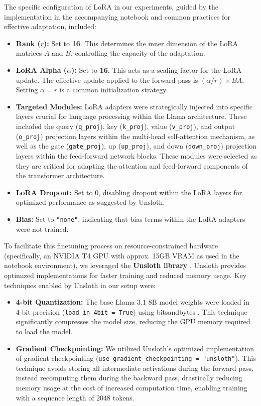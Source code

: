 \documentclass[twocolumn,11pt,letterpaper]{article}
\begin{document}
The specific configuration of LoRA in our experiments, guided by the implementation in the accompanying notebook and common practices for effective adaptation, included:
\begin{itemize}
    \item \textbf{Rank ($r$):} Set to \textbf{16}. This determines the inner dimension of the LoRA matrices $A$ and $B$, controlling the capacity of the adaptation.
    \item \textbf{LoRA Alpha ($\alpha$):} Set to \textbf{16}. This acts as a scaling factor for the LoRA update. The effective update applied to the forward pass is $(\alpha / r) \times BA$. Setting $\alpha = r$ is a common initialization strategy.
    \item \textbf{Targeted Modules:} LoRA adapters were strategically injected into specific layers crucial for language processing within the Llama architecture. These included the query (\texttt{q\_proj}), key (\texttt{k\_proj}), value (\texttt{v\_proj}), and output (\texttt{o\_proj}) projection layers within the multi-head self-attention mechanism, as well as the gate (\texttt{gate\_proj}), up (\texttt{up\_proj}), and down (\texttt{down\_proj}) projection layers within the feed-forward network blocks. These modules were selected as they are critical for adapting the attention and feed-forward components of the transformer architecture.
    \item \textbf{LoRA Dropout:} Set to 0, disabling dropout within the LoRA layers for optimized performance as suggested by Unsloth.
    \item \textbf{Bias:} Set to \texttt{"none"}, indicating that bias terms within the LoRA adapters were not trained.
\end{itemize}

To facilitate this finetuning process on resource-constrained hardware (specifically, an NVIDIA T4 GPU with approx. 15GB VRAM as used in the notebook environment), we leveraged the \textbf{Unsloth library} \cite{unsloth}. Unsloth provides optimized implementations for faster training and reduced memory usage. Key techniques enabled by Unsloth in our setup were:
\begin{itemize}
    \item \textbf{4-bit Quantization:} The base Llama 3.1 8B model weights were loaded in 4-bit precision (\texttt{load\_in\_4bit = True}) using bitsandbytes \cite{bitsandbytes}. This technique significantly compresses the model size, reducing the GPU memory required to load the model.
    \item \textbf{Gradient Checkpointing:} We utilized Unsloth's optimized implementation of gradient checkpointing (\texttt{use\_gradient\_checkpointing = "unsloth"}). This technique avoids storing all intermediate activations during the forward pass, instead recomputing them during the backward pass, drastically reducing memory usage at the cost of increased computation time, enabling training with a sequence length of 2048 tokens.
\end{itemize}
\end{document}

